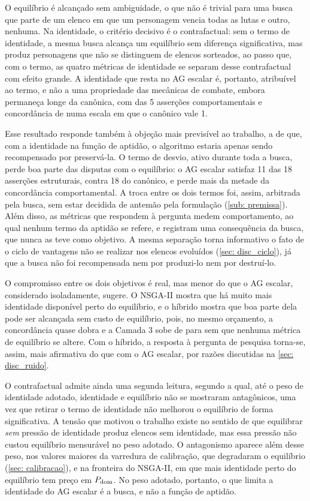 O equilíbrio é alcançado sem ambiguidade, o que não é trivial para uma busca que parte de um elenco em que um personagem vencia todas as lutas e outro, nenhuma. Na identidade, o critério decisivo é o contrafactual: sem o termo de identidade, a mesma busca alcança um equilíbrio sem diferença significativa, mas produz personagens que não se distinguem de elencos sorteados, ao passo que, com o termo, as quatro métricas de identidade se separam desse contrafactual com efeito grande. A identidade que resta no AG escalar é, portanto, atribuível ao termo, e não a uma propriedade das mecânicas de combate, embora permaneça longe da canônica, com \LtresAG{} das 5 asserções comportamentais e concordância de \tauAG{} numa escala em que o canônico vale 1.

Esse resultado responde também à objeção mais previsível ao trabalho, a de que, com a identidade na função de aptidão, o algoritmo estaria apenas sendo recompensado por preservá-la. O termo de desvio, ativo durante toda a busca, perde boa parte das disputas com o equilíbrio: o AG escalar satisfaz 11 das 18 asserções estruturais, contra 18 do canônico, e perde mais da metade da concordância comportamental. A troca entre os dois termos foi, assim, arbitrada pela busca, sem estar decidida de antemão pela formulação (\autoref{sub: premissa}). Além disso, as métricas que respondem à pergunta medem comportamento, ao qual nenhum termo da aptidão se refere, e registram uma consequência da busca, que nunca as teve como objetivo. A mesma separação torna informativo o fato de o ciclo de vantagens não se realizar nos elencos evoluídos (\autoref{sec: disc_ciclo}), já que a busca não foi recompensada nem por produzi-lo nem por destruí-lo.

O compromisso entre os dois objetivos é real, mas menor do que o AG escalar, considerado isoladamente, sugere. O NSGA-II mostra que há muito mais identidade disponível perto do equilíbrio, e o híbrido mostra que boa parte dela pode ser alcançada sem custo de equilíbrio, pois, no mesmo orçamento, a concordância quase dobra e a Camada 3 sobe de \LtresAG{} para \LtresHib{} sem que nenhuma métrica de equilíbrio se altere. Com o híbrido, a resposta à pergunta de pesquisa torna-se, assim, mais afirmativa do que com o AG escalar, por razões discutidas na \autoref{sec: disc_ruido}.

O contrafactual admite ainda uma segunda leitura, segundo a qual, até o peso de identidade adotado, identidade e equilíbrio não se mostraram antagônicos, uma vez que retirar o termo de identidade não melhorou o equilíbrio de forma significativa. A tensão que motivou o trabalho existe no sentido de que equilibrar \textit{sem} pressão de identidade produz elencos sem identidade, mas essa pressão não custou equilíbrio mensurável no peso adotado. O antagonismo aparece além desse peso, nos valores maiores da varredura de calibração, que degradaram o equilíbrio (\autoref{sec: calibracao}), e na fronteira do NSGA-II, em que mais identidade perto do equilíbrio tem preço em $P_{\mathrm{dom}}$. No peso adotado, portanto, o que limita a identidade do AG escalar é a busca, e não a função de aptidão.

